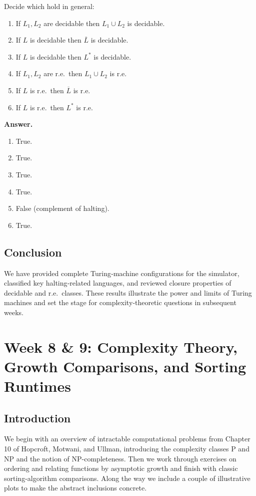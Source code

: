 \documentclass{article}
\theoremstyle{theorem}
\theoremstyle{definition}
\theoremstyle{remark}
\begin{document}
Decide which hold in general:
\begin{enumerate}
  \item If \(L_1,L_2\) are decidable then \(L_1\cup L_2\) is decidable.
  \item If \(L\) is decidable then \(\overline L\) is decidable.
  \item If \(L\) is decidable then \(L^*\) is decidable.
  \item If \(L_1,L_2\) are r.e.\ then \(L_1\cup L_2\) is r.e.
  \item If \(L\) is r.e.\ then \(\overline L\) is r.e.
  \item If \(L\) is r.e.\ then \(L^*\) is r.e.
\end{enumerate}
\textbf{Answer.}
\begin{enumerate}
  \item True.
  \item True.
  \item True.
  \item True.
  \item False (complement of halting).
  \item True.
\end{enumerate}

\subsection{Conclusion}

We have provided complete Turing‐machine configurations for the simulator, classified key halting‐related languages, and reviewed closure properties of decidable and r.e.\ classes.  These results illustrate the power and limits of Turing machines and set the stage for complexity‐theoretic questions in subsequent weeks.

\newpage

\section{Week 8 \& 9: Complexity Theory, Growth Comparisons, and Sorting Runtimes}

\subsection{Introduction}
We begin with an overview of intractable computational problems from Chapter 10 of Hopcroft, Motwani, and Ullman, introducing the complexity classes P and NP and the notion of NP-completeness. Then we work through exercises on ordering and relating functions by asymptotic growth and finish with classic sorting-algorithm comparisons. Along the way we include a couple of illustrative plots to make the abstract inclusions concrete.
\end{document}
